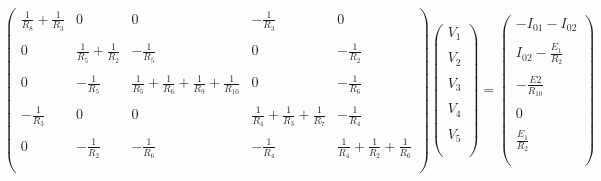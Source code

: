 \documentclass[a4paper]{article}
\begin{document}
\begin{equation*}
\begin{pmatrix}
\frac{1}{R_8} + \frac{1}{R_3} & 0 & 0 & -\frac{1}{R_3} & 0\\\\

0 & \frac{1}{R_5} + \frac{1}{R_2}  & -\frac{1}{R_5} & 0 & -\frac{1}{R_2}\\\\

0 & - \frac{1}{R_5} & \frac{1}{R_5} + \frac{1}{R_6} + \frac{1}{R_9} + \frac{1}{R_{10}} & 0 & -\frac{1}{R_6}\\\\

 -\frac{1}{R_3} & 0 & 0 & \frac{1}{R_4} + \frac{1}{R_3} + \frac{1}{R_7} & -\frac{1}{R_4}\\\\

0 & -\frac{1}{R_2} & -\frac{1}{R_6} & -\frac{1}{R_4} & \frac{1}{R_4} + \frac{1}{R_2} + \frac{1}{R_6}\\\\

\end{pmatrix}
 \begin{pmatrix}
    V_1\\\\
    V_2\\\\
    V_3\\\\
    V_4\\\\
    V_5\\\\
\end{pmatrix}
=
\begin{pmatrix}
    -I_{01} - I_{02}\\\\
    I_{02} - \frac{E_1}{R_2}\\\\
    -\frac{E2}{R_{10}}\\\\
    0\\\\
    \frac{E_1}{R_2}\\\\

\end{pmatrix}
\end{equation*}
 
\end{document}
